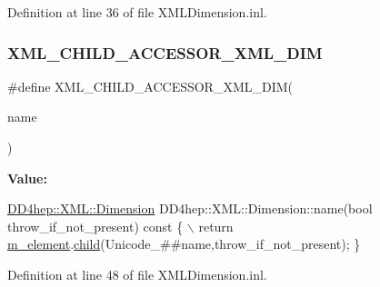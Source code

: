 Definition at line 36 of file X\+M\+L\+Dimension.\+inl.

\hypertarget{_x_m_l_dimension_8inl_af3b6c67a307b3febcce9072bfcfd4d5e}{}\label{_x_m_l_dimension_8inl_af3b6c67a307b3febcce9072bfcfd4d5e} 
\subsubsection{\texorpdfstring{X\+M\+L\+\_\+\+C\+H\+I\+L\+D\+\_\+\+A\+C\+C\+E\+S\+S\+O\+R\+\_\+\+X\+M\+L\+\_\+\+D\+IM}{XML\_CHILD\_ACCESSOR\_XML\_DIM}}
{\footnotesize\ttfamily \#define X\+M\+L\+\_\+\+C\+H\+I\+L\+D\+\_\+\+A\+C\+C\+E\+S\+S\+O\+R\+\_\+\+X\+M\+L\+\_\+\+D\+IM(\begin{DoxyParamCaption}\item[{}]{name }\end{DoxyParamCaption})}

{\bfseries Value\+:}
\begin{DoxyCode}
\hyperlink{struct_d_d4hep_1_1_x_m_l_1_1_dimension}{DD4hep::XML::Dimension} DD4hep::XML::Dimension::name(\textcolor{keywordtype}{bool} throw\_if\_not\_present)\textcolor{keyword}{ const }
      \{                \(\backslash\)
    return \hyperlink{class_d_d4hep_1_1_x_m_l_1_1_element_aa79a832ef142a29be556a3ec21c4e36d}{m\_element}.\hyperlink{class_d_d4hep_1_1_x_m_l_1_1_handle__t_aba89b01b45f745b58bf27c9463f05742}{child}(Unicode\_##name,throw\_if\_not\_present); \}
\end{DoxyCode}


Definition at line 48 of file X\+M\+L\+Dimension.\+inl.

